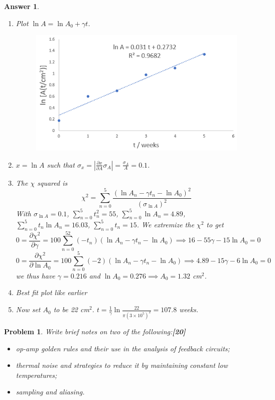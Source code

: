 \documentclass[a4paper]{article}
\newtheorem{ans}{Answer}[subsection]
\theoremstyle{new}
\newtheorem{qns}{Problem}[subsection]
\begin{document}
\newpage
\begin{ans}\leavevmode
\begin{enumerate}[label=(\roman*)]
\item Plot $\ln A=\ln A_0+\gamma t$.
\begin{figure}[H]
    \centering
    \includegraphics[scale=0.75]{2016P1D12.PNG}
\end{figure}
\item $x=\ln A$ such that $\sigma_x=|\frac{\partial x}{\partial A}\sigma_A|=\frac{\sigma_A}{A}=0.1$.
\item The $\chi$ squared is
$$\chi^2=\sum_{n=0}^5\frac{(\ln A_n-\gamma t_n-\ln A_0)^2}{(\sigma_{\ln A})^2}$$
With $\sigma_{\ln A}=0.1$, $\sum_{n=0}^5 t_n^2=55$, $\sum_{n=0}^5\ln A_n=4.89$, $\sum_{n=0}^5 t_n\ln A_n=16.03$, $\sum_{n=0}^5t_n=15$. We extremize the $\chi^2$ to get
$$0=\frac{\partial\chi^2}{\partial\gamma}=100\sum_{n=0}^52(-t_n)(\ln A_n-\gamma t_n-\ln A_0)\implies 16-55\gamma-15\ln A_0=0$$
$$0=\frac{\partial\chi^2}{\partial\ln A_0}=100\sum_{n=0}^5(-2)(\ln A_n-\gamma t_n-\ln A_0)\implies 4.89-15\gamma-6\ln A_0=0$$
we thus have $\gamma=0.216$ and $\ln A_0=0.276\implies A_0=1.32$ cm$^2$.
\item Best fit plot like earlier
\item Now set $A_0$ to be 22 cm$^2$. $t=\frac{1}{\gamma}\ln\frac{22}{\pi(3\times10^5)^2}=107.8$ weeks.
\end{enumerate}
\end{ans}
\newpage
\begin{qns}
Write brief notes on two of the following:\hfill\textbf{[20]}
\begin{itemize}
    \item op-amp golden rules and their use in the analysis of feedback circuits;
    \item thermal noise and strategies to reduce it by maintaining constant low
temperatures;
    \item sampling and aliasing.
\end{itemize}
\end{qns}
\end{document}
